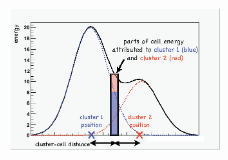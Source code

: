 \begin{figure}[t!]
\centering
\includegraphics[width=0.50\textwidth]{figures/energy_sharing.png}
\label{fig:clustering}                                                                                                               
\end{figure}
